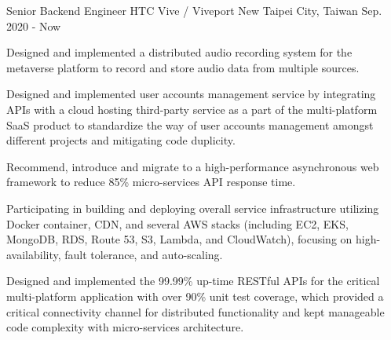 

\begin{cventries}

    \cventry
    {Senior Backend Engineer} %
    {HTC Vive / Viveport} %
    {New Taipei City, Taiwan} %
    {Sep. 2020 - Now} %
    {
        \begin{cvitems} %
        \item {Designed and implemented a distributed audio recording system for the metaverse platform to record and store audio data from multiple sources. }
        \item {Designed and implemented user accounts management service by integrating APIs with a cloud hosting third-party service as a part of the multi-platform SaaS product to standardize the way of user accounts management amongst different projects and mitigating code duplicity.}
        \item {Recommend, introduce and migrate to a high-performance asynchronous web framework to reduce 85\% micro-services API response time.}
        \item {Participating in building and deploying overall service infrastructure utilizing Docker container, CDN, and several AWS stacks (including EC2, EKS, MongoDB, RDS, Route 53, S3, Lambda, and CloudWatch), focusing on high-availability, fault tolerance, and auto-scaling.}
        \item {Designed and implemented the 99.99\% up-time RESTful APIs for the critical multi-platform application with over 90\% unit test coverage, which provided a critical connectivity channel for distributed functionality and kept manageable code complexity with micro-services architecture.}

\end{cvitems}}
\end{cventries}
